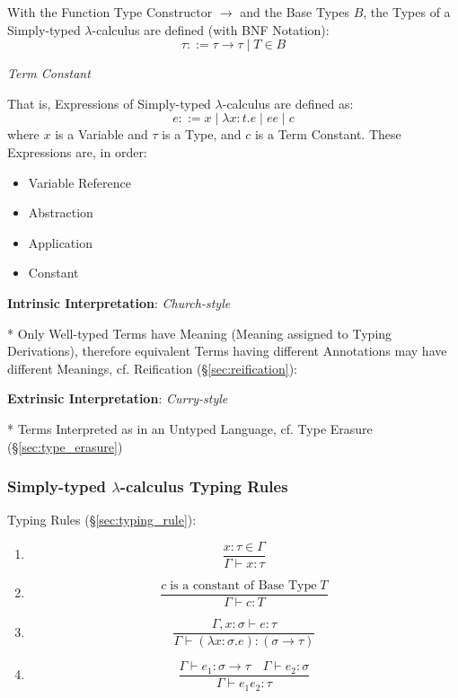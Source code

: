 With the Function Type Constructor $\rightarrow$ and the Base Types
$B$, the Types of a Simply-typed $\lambda$-calculus are defined (with
BNF Notation):
\[
  \tau ::= \tau \rightarrow \tau \;|\; T \in B
\]

\emph{Term Constant}

That is, Expressions of Simply-typed $\lambda$-calculus are defined
as:
\[
  e ::= x \;|\; \lambda x:t.e \;|\; e e \;|\; c
\]
where $x$ is a Variable and $\tau$ is a Type, and $c$ is a Term
Constant. These Expressions are, in order:
\begin{itemize}
  \item Variable Reference
  \item Abstraction
  \item Application
  \item Constant
\end{itemize}



\textbf{Intrinsic Interpretation}: \emph{Church-style}

* Only Well-typed Terms have Meaning (Meaning assigned to Typing
Derivations), therefore equivalent Terms having different Annotations
may have different Meanings, cf. Reification
(\S\ref{sec:reification}):



\textbf{Extrinsic Interpretation}: \emph{Curry-style}

* Terms Interpreted as in an Untyped Language, cf. Type Erasure
(\S\ref{sec:type_erasure})



\subsubsection{Simply-typed $\lambda$-calculus Typing Rules}
\label{sec:simplytyped_rules}

Typing Rules (\S\ref{sec:typing_rule}):
\begin{enumerate}
\item
  \[
    {
      \frac
      {x : \tau \in \Gamma}
      {\Gamma \vdash x : \tau}
    }
  \]
\item
  \[
    {
      \frac
      {c \;\text{is a constant of Base Type}\; T}
      {\Gamma \vdash c:T}
    }
  \]
\item
  \[
    {
      \frac
      {\Gamma, x:\sigma \vdash e:\tau}
      {\Gamma \vdash (\lambda x:\sigma.e):(\sigma \rightarrow \tau)}
    }
  \]
\item
  \[
    {
      \frac
      {\Gamma \vdash e_1:\sigma \rightarrow \tau \quad
        \Gamma \vdash e_2:\sigma}
      {\Gamma \vdash e_1 e_2 : \tau}
    }
  \]
\end{enumerate}



